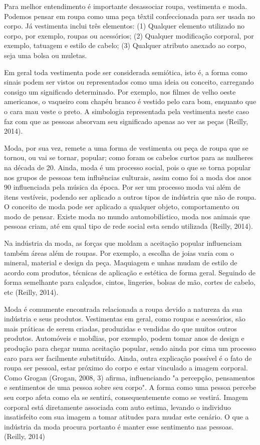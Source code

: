 \documentclass[12pt]{report}
\begin{document}
Para melhor entendimento é importante desassociar roupa, vestimenta e moda. Podemos pensar em roupa como uma peça têxtil confeccionada para ser usada no corpo. Já vestimenta inclui três elementos: (1) Qualquer elemento utilizado no corpo, por exemplo, roupas ou acessórios; (2) Qualquer modificação corporal, por exemplo, tatuagem e estilo de cabelo; (3) Qualquer atributo anexado ao corpo, seja uma bolsa ou muletas. 

Em geral toda vestimenta pode ser considerada semiótica, isto é, a forma como sinais podem ser vistos ou representados como uma ideia ou conceito, carregando consigo um significado determinado. Por exemplo, nos filmes de velho oeste americanos, o vaqueiro com chapéu branco é vestido pelo cara bom, enquanto que o cara mau veste o preto. A simbologia representada pela vestimenta neste caso faz com que as pessoas absorvam seu significado apenas ao ver as peças (Reilly, 2014).

Moda, por sua vez, remete a uma forma de vestimenta ou peça de roupa que se tornou, ou vai se tornar, popular; como foram os cabelos curtos para as mulheres na década de 20. Ainda, moda é um processo social, pois o que se torna popular nos grupos de pessoas tem influências culturais, assim como foi a moda dos anos 90 influenciada pela música da época. Por ser um processo moda vai além de itens vestíveis, podendo ser aplicado a outros tipos de indústria que não de roupa. O conceito de moda pode ser aplicado a qualquer objeto, comportamento ou modo de pensar. Existe moda no mundo automobilístico, moda nos animais que pessoas criam, até em qual tipo de rede social esta sendo utilizada (Reilly, 2014).

Na indústria da moda, as forças que moldam a aceitação popular influenciam também áreas além de roupas. Por exemplo, a escolha de joias varia com o mineral, material e design da peça. Maquiagem e unhas mudam de estilo de acordo com produtos, técnicas de aplicação e estética de forma geral. Seguindo de forma semelhante para calçados, cintos, lingeries, bolsas de mão, cortes de cabelo, etc (Reilly, 2014).

Moda é comumente encontrada relacionada a roupa devido a natureza da sua indústria e seus produtos. Vestimentas em geral, como roupas e acessórios, são mais práticas de serem criadas, produzidas e vendidas do que muitos outros produtos. Automóveis e mobílias, por exemplo, podem tomar anos de design e produção para chegar numa aceitação popular, sendo ainda por cima um processo caro para ser facilmente substituído. Ainda, outra explicação possível é o fato de roupa ser pessoal, estar próximo do corpo e estar vinculado a imagem corporal. Como Grogan (Grogan, 2008, 3) afirma, influenciando "a percepção, pensamentos e sentimentos de uma pessoa sobre seu corpo". A forma como uma pessoa percebe seu corpo afeta como ela se sentirá, consequentemente como se vestirá. Imagem corporal está diretamente associada com auto estima, levando o individuo insatisfeito com sua imagem a tomar atitudes para mudar este cenário. O que a indústria da moda procura portanto é manter esse sentimento nas pessoas. (Reilly, 2014)
\end{document}
